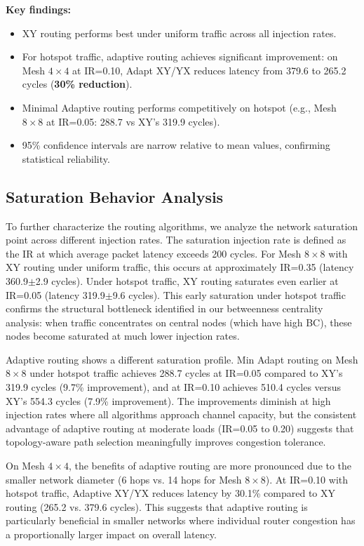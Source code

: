 \documentclass[conference]{IEEEtran}
\begin{document}
\textbf{Key findings:}
\begin{itemize}
    \item XY routing performs best under uniform traffic across all injection rates.
    \item For hotspot traffic, adaptive routing achieves significant improvement: on Mesh $4\times4$ at IR=0.10, Adapt XY/YX reduces latency from 379.6 to 265.2 cycles (\textbf{30\% reduction}).
    \item Minimal Adaptive routing performs competitively on hotspot (e.g., Mesh $8\times8$ at IR=0.05: 288.7 vs XY's 319.9 cycles).
    \item 95\% confidence intervals are narrow relative to mean values, confirming statistical reliability.
\end{itemize}

\subsection{Saturation Behavior Analysis}
\label{sec:saturation}

To further characterize the routing algorithms, we analyze the network saturation point across different injection rates. The saturation injection rate is defined as the IR at which average packet latency exceeds 200 cycles. For Mesh $8\times8$ with XY routing under uniform traffic, this occurs at approximately IR=0.35 (latency 360.9$\pm$2.9 cycles). Under hotspot traffic, XY routing saturates even earlier at IR=0.05 (latency 319.9$\pm$9.6 cycles). This early saturation under hotspot traffic confirms the structural bottleneck identified in our betweenness centrality analysis: when traffic concentrates on central nodes (which have high BC), these nodes become saturated at much lower injection rates.

Adaptive routing shows a different saturation profile. Min Adapt routing on Mesh $8\times8$ under hotspot traffic achieves 288.7 cycles at IR=0.05 compared to XY's 319.9 cycles (9.7\% improvement), and at IR=0.10 achieves 510.4 cycles versus XY's 554.3 cycles (7.9\% improvement). The improvements diminish at high injection rates where all algorithms approach channel capacity, but the consistent advantage of adaptive routing at moderate loads (IR=0.05 to 0.20) suggests that topology-aware path selection meaningfully improves congestion tolerance.

On Mesh $4\times4$, the benefits of adaptive routing are more pronounced due to the smaller network diameter (6 hops vs. 14 hops for Mesh $8\times8$). At IR=0.10 with hotspot traffic, Adaptive XY/YX reduces latency by 30.1\% compared to XY routing (265.2 vs. 379.6 cycles). This suggests that adaptive routing is particularly beneficial in smaller networks where individual router congestion has a proportionally larger impact on overall latency.
\end{document}
